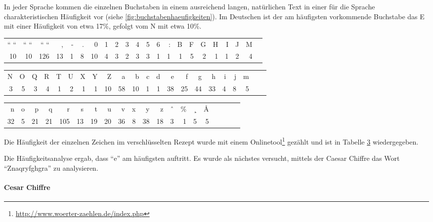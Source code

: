 In jeder Sprache kommen die einzelnen Buchstaben in einem ausreichend langen,
natürlichen Text in einer für die Sprache charakteristischen Häufigkeit vor
(siehe \cref{fig:buchstabenhaeufigkeiten}). Im Deutschen ist der am
häufigsten vorkommende Buchstabe das E mit einer Häufigkeit von etwa 17\%,
gefolgt vom N mit etwa 10\%.

\begin{table}[h]\footnotesize
\begin{tabular}{*{22}{r}}
  `` ``  &  `` ``  &  `` ``  &  ,  &  -  &  .  &  0  &  1  &  2  &  3  &  4  &  5  &  6  &  :  &  B  &  F  &  G  &  H & I & J  &  M \\
  10  &   10  &  126  &   13  &  1  &  8  &   10  &  4  &  3  &  2  &  3  &  3  &  1  &  1  &  1  &  5  &  2  &  1 & 1 & 2 & 4 \\
\end{tabular}

\begin{tabular}{*{22}{r}}
N  &  O  &  Q  &  R  &  T  &  U  &  X  &  Y  &  Z  &  a  &  b  &  c  &  d  &  e  &  f  &  g  &  h  &  i  &  j & m \\
3  &      5  &      3  &      4  &      1  &      2  &      1  &      1  &     10  &     58  &     10  &      1  &      1  &     38  &     25  &     44  &     33  &      4  &      8  &      5 \\
\end{tabular}

\begin{tabular}{*{20}{r}}
n  &  o  &  p  &  q  &  r  &  s  &  t  &  u  &  v  &  x  &  y  &  z  &  ˆ  &  \%  &  ¸  &  Å  \\
32  &      5  &     21  &     21  &    105  &     13  &     19  &     20  &     36  &      8  &     38  &     18  &      3  &      1  &      5  &      5  \\
\end{tabular}
\label{tab:rezept1haeufigkeit}
\end{table}

Die Häufigkeit der einzelnen Zeichen im verschlüsselten Rezept wurde mit einem
Onlinetool\footnote{\url{http://www.woerter-zaehlen.de/index.php}} gezählt und
ist in Tabelle \ref{tab:rezept1haeufigkeit} wiedergegeben.

Die Häufigkeitsanalyse ergab, dass ``e'' am häufigsten auftritt.
Es wurde als nächstes versucht, mittels der Caesar Chiffre das Wort
``Znaqryfghgra'' zu analysieren.

\paragraph{Cesar Chiffre}

